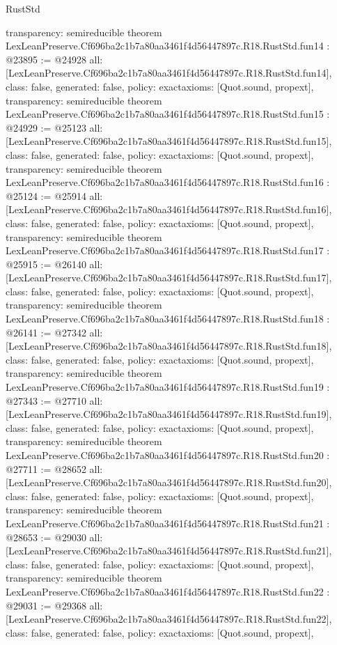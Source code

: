 \begin{lexlean}{RustStd}
\begin{coremodule}
{  transparency: semireducible
}
theorem LexLeanPreserve.Cf696ba2c1b7a80aa3461f4d56447897c.R18.RustStd.fun14 : @23895 := @24928 {
  all: [LexLeanPreserve.Cf696ba2c1b7a80aa3461f4d56447897c.R18.RustStd.fun14],
  class: false,
  generated: false,
  policy: exact{axioms: [Quot.sound, propext]},
  transparency: semireducible
}
theorem LexLeanPreserve.Cf696ba2c1b7a80aa3461f4d56447897c.R18.RustStd.fun15 : @24929 := @25123 {
  all: [LexLeanPreserve.Cf696ba2c1b7a80aa3461f4d56447897c.R18.RustStd.fun15],
  class: false,
  generated: false,
  policy: exact{axioms: [Quot.sound, propext]},
  transparency: semireducible
}
theorem LexLeanPreserve.Cf696ba2c1b7a80aa3461f4d56447897c.R18.RustStd.fun16 : @25124 := @25914 {
  all: [LexLeanPreserve.Cf696ba2c1b7a80aa3461f4d56447897c.R18.RustStd.fun16],
  class: false,
  generated: false,
  policy: exact{axioms: [Quot.sound, propext]},
  transparency: semireducible
}
theorem LexLeanPreserve.Cf696ba2c1b7a80aa3461f4d56447897c.R18.RustStd.fun17 : @25915 := @26140 {
  all: [LexLeanPreserve.Cf696ba2c1b7a80aa3461f4d56447897c.R18.RustStd.fun17],
  class: false,
  generated: false,
  policy: exact{axioms: [Quot.sound, propext]},
  transparency: semireducible
}
theorem LexLeanPreserve.Cf696ba2c1b7a80aa3461f4d56447897c.R18.RustStd.fun18 : @26141 := @27342 {
  all: [LexLeanPreserve.Cf696ba2c1b7a80aa3461f4d56447897c.R18.RustStd.fun18],
  class: false,
  generated: false,
  policy: exact{axioms: [Quot.sound, propext]},
  transparency: semireducible
}
theorem LexLeanPreserve.Cf696ba2c1b7a80aa3461f4d56447897c.R18.RustStd.fun19 : @27343 := @27710 {
  all: [LexLeanPreserve.Cf696ba2c1b7a80aa3461f4d56447897c.R18.RustStd.fun19],
  class: false,
  generated: false,
  policy: exact{axioms: [Quot.sound, propext]},
  transparency: semireducible
}
theorem LexLeanPreserve.Cf696ba2c1b7a80aa3461f4d56447897c.R18.RustStd.fun20 : @27711 := @28652 {
  all: [LexLeanPreserve.Cf696ba2c1b7a80aa3461f4d56447897c.R18.RustStd.fun20],
  class: false,
  generated: false,
  policy: exact{axioms: [Quot.sound, propext]},
  transparency: semireducible
}
theorem LexLeanPreserve.Cf696ba2c1b7a80aa3461f4d56447897c.R18.RustStd.fun21 : @28653 := @29030 {
  all: [LexLeanPreserve.Cf696ba2c1b7a80aa3461f4d56447897c.R18.RustStd.fun21],
  class: false,
  generated: false,
  policy: exact{axioms: [Quot.sound, propext]},
  transparency: semireducible
}
theorem LexLeanPreserve.Cf696ba2c1b7a80aa3461f4d56447897c.R18.RustStd.fun22 : @29031 := @29368 {
  all: [LexLeanPreserve.Cf696ba2c1b7a80aa3461f4d56447897c.R18.RustStd.fun22],
  class: false,
  generated: false,
  policy: exact{axioms: [Quot.sound, propext]},
}
\end{coremodule}
\end{lexlean}
